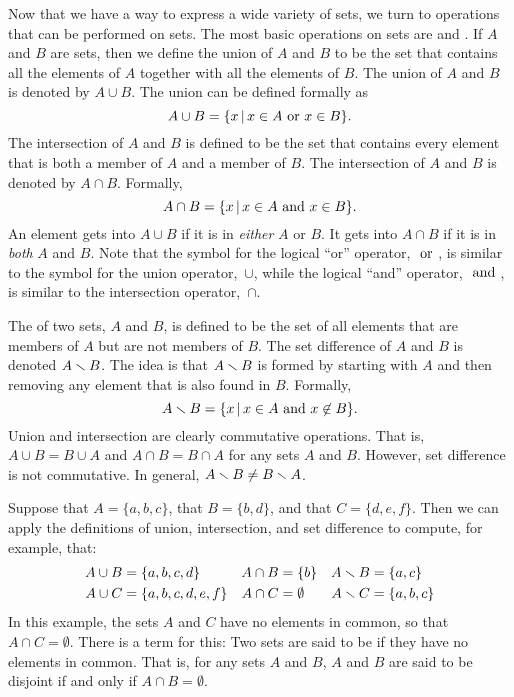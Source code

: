 


\medbreak

Now that we have a way to express a wide variety of sets, we turn to operations that
can be performed on sets.
The most basic operations on sets are  and .
If $A$ and $B$ are sets, then we define the union of $A$ and $B$ to be the set that contains all the elements of $A$ together with all the elements of $B$.
The union of $A$ and $B$ is denoted by $A\cup B$.
The union can be defined formally as
\[A\cup B = \{x\,|\, x\in A \text{ or } x\in B\}.\]
The intersection of $A$ and $B$ is defined to be the set that contains every element that is both a member of $A$ and a member of $B$.
The intersection of $A$ and $B$ is denoted by $A\cap B$.
Formally,
\[A\cap B = \{x\,|\, x\in A \text{ and } x\in B\}.\]
An element gets into $A\cup B$ if it is in \emph{either} $A$ or $B$.
It gets into $A\cap B$ if it is in \emph{both} $A$ and $B$.
Note that the symbol for the logical ``or'' operator, $\text{ or }$, is similar to the symbol for the union operator,~$\cup$, while the logical ``and'' operator, $\text{ and }$, is similar to the intersection operator,~$\cap$.

The  of two sets, $A$ and $B$, is defined to be
the set of all elements that are members of $A$ but are not members
of $B$.
The set difference of $A$ and $B$ is denoted $A\smallsetminus B$.
The idea is that $A\smallsetminus B$ is formed by starting with $A$ and then removing any element that is also found in $B$.
Formally,
\[A\smallsetminus B = \{x\,|\, x\in A \text{ and } x\not\in B\}.\]
Union and intersection are clearly commutative operations.
That is, $A\cup B=B\cup A$ and $A\cap B=B\cap A$ for any sets $A$ and $B$.
However, set difference is not commutative.
In general, $A\smallsetminus B \not= B\smallsetminus A$.

Suppose that $A=\{a,b,c\}$, that $B=\{b,d\}$, and
that $C=\{d,e,f\}$.  Then we can apply the definitions of
union, intersection, and set difference to compute, for example,
that:
\begin{align*}
   A\cup B &= \{a,b,c,d\} &  A\cap B &= \{b\}   &  A\smallsetminus B &= \{a,c\}\\
   A\cup C &= \{a,b,c,d,e,f\}&A\cap C&= \emptyset & A\smallsetminus C &= \{a,b,c\}
\end{align*}
In this example, the sets $A$ and $C$ have no elements in common, so
that $A\cap C=\emptyset$.  There is a term for this:
Two sets are said to be  if they
have no elements in common.  That is, for any sets $A$ and $B$,
$A$ and $B$ are said to be disjoint if and only if $A\cap B=\emptyset$.


